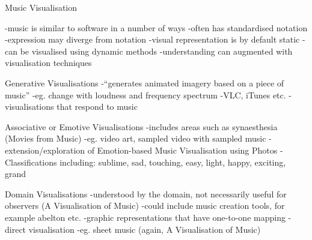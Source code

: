 Music Visualisation

-music is similar to software in a number of ways
-often has standardised notation
-expression may diverge from notation
-visual representation is by default static
-can be visualised using dynamic methods
-understanding can augmented with visualisation techniques

Generative Visualisations
-“generates animated imagery based on a piece of music”
-eg. change with loudness and frequency spectrum
-VLC, iTunes etc.
-visualisations that respond to music

Associative or Emotive Visualisations
-includes areas such as synaesthesia (Movies from Music)
-eg. video art, sampled video with sampled music
-extension/exploration of Emotion-based Music Visualisation using Photos
-Classifications including: sublime, sad, touching, easy, light, happy, exciting, grand

Domain Visualisations
-understood by the domain, not necessarily useful for observers (A Visualisation of Music)
-could include music creation tools, for example abelton etc.
-graphic representations that have one-to-one mapping
-direct visualisation
-eg. sheet music (again, A Visualisation of Music)



